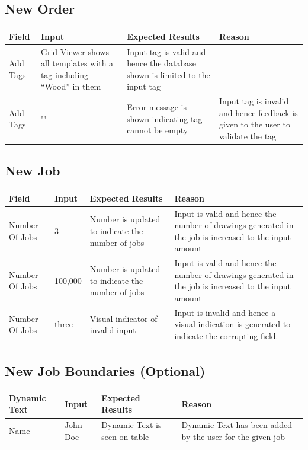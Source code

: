 \documentclass[oneside,openany,11pt,a4paper]{report}
\begin{document}
\subsection{New Order}
\begin{longtable}{|p{3cm}|p{3cm}|p{4.5cm}|p{4.5cm}|}
	\hline
	\rowcolor{gray!50}
	\textbf{Field} & \textbf{Input} &  \textbf{Expected Results} & \textbf{Reason} \\ \hline
	
	Add Tags & Grid Viewer shows all templates with a tag including “Wood” in them & Input tag is valid and hence the database shown is limited to the input tag \\ \hline
	
	Add Tags & "" & Error message is shown indicating tag cannot be empty & Input tag is invalid and hence feedback is given to the user to validate the tag \\ \hline
	
\end{longtable}

\subsection{New Job}
\begin{longtable}{|p{3cm}|p{3cm}|p{4.5cm}|p{4.5cm}|}
	\hline
	\rowcolor{gray!50}
	\textbf{Field} & \textbf{Input} &  \textbf{Expected Results} & \textbf{Reason} \\ \hline
	
	Number Of Jobs & 3 & Number is updated to indicate the number of jobs & Input is valid and hence the number of drawings generated in the job is increased to the input amount \\ \hline
	
	Number Of Jobs & 100,000 & Number is updated to indicate the number of jobs & Input is valid and hence the number of drawings generated in the job is increased to the input amount \\ \hline
	
	Number Of Jobs & three & Visual indicator of invalid input & Input is invalid and hence a visual indication is generated to indicate the corrupting field. \\ \hline
	
\end{longtable}

\subsection{New Job Boundaries (Optional)}
\begin{longtable}{|p{3cm}|p{3cm}|p{4.5cm}|p{4.5cm}|}
	\hline
	\rowcolor{gray!50}
	\textbf{Dynamic Text} & \textbf{Input} &  \textbf{Expected Results} & \textbf{Reason} \\ \hline
	
	Name & John Doe &Dynamic Text is seen on table & Dynamic Text has been added by the user for the given job \\ \hline
	
\end{longtable}
\end{document}

